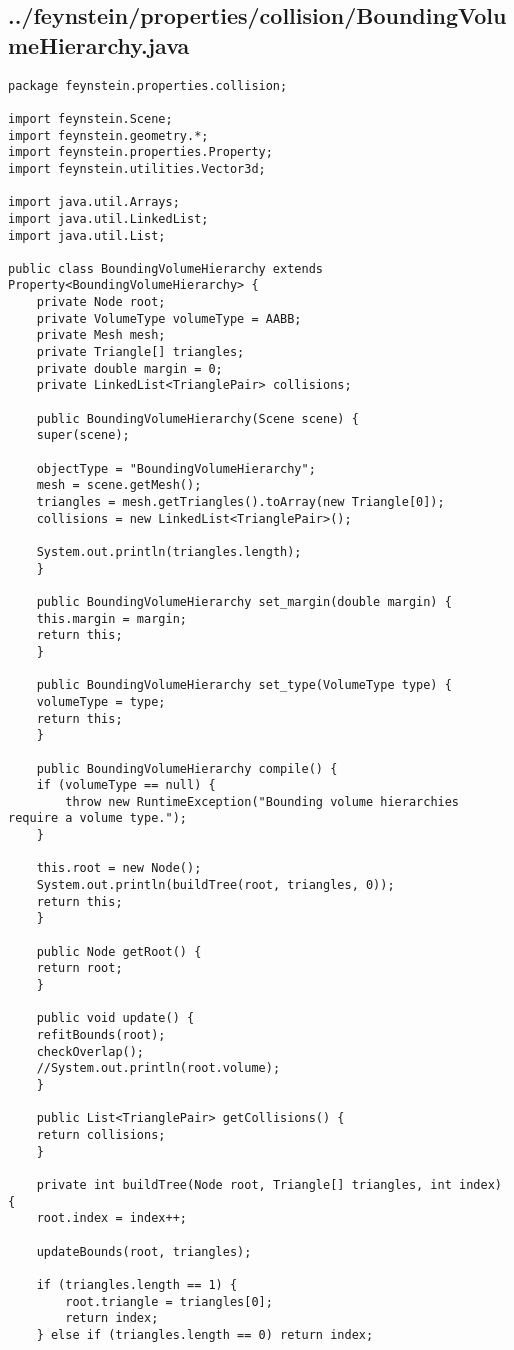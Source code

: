 \subsection*{../feynstein/properties/collision/BoundingVolumeHierarchy.java}
\begin{lstlisting}
package feynstein.properties.collision;

import feynstein.Scene;
import feynstein.geometry.*;
import feynstein.properties.Property;
import feynstein.utilities.Vector3d;

import java.util.Arrays;
import java.util.LinkedList;
import java.util.List;

public class BoundingVolumeHierarchy extends Property<BoundingVolumeHierarchy> {
    private Node root;
    private VolumeType volumeType = AABB;
    private Mesh mesh;
    private Triangle[] triangles;
    private double margin = 0;
    private LinkedList<TrianglePair> collisions;

    public BoundingVolumeHierarchy(Scene scene) {
	super(scene);

	objectType = "BoundingVolumeHierarchy";
	mesh = scene.getMesh();
	triangles = mesh.getTriangles().toArray(new Triangle[0]);
	collisions = new LinkedList<TrianglePair>();

	System.out.println(triangles.length);
    }

    public BoundingVolumeHierarchy set_margin(double margin) {
	this.margin = margin;
	return this;
    }

    public BoundingVolumeHierarchy set_type(VolumeType type) {
	volumeType = type;
	return this;
    }

    public BoundingVolumeHierarchy compile() {
	if (volumeType == null) {
	    throw new RuntimeException("Bounding volume hierarchies require a volume type.");
	}

	this.root = new Node();
	System.out.println(buildTree(root, triangles, 0));
	return this;
    }

    public Node getRoot() {
	return root;
    }

    public void update() {
	refitBounds(root);
	checkOverlap();
	//System.out.println(root.volume);
    }

    public List<TrianglePair> getCollisions() {
	return collisions;
    }

    private int buildTree(Node root, Triangle[] triangles, int index) {
	root.index = index++;
	
	updateBounds(root, triangles);

	if (triangles.length == 1) {
	    root.triangle = triangles[0];
	    return index;
	} else if (triangles.length == 0) return index;


\end{lstlisting}
